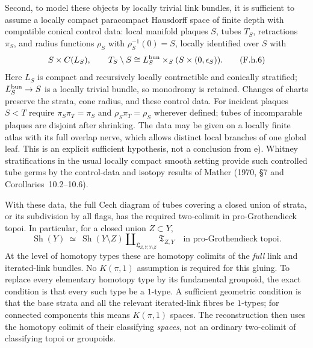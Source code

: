 Second, to model these objects by locally trivial link bundles, it is
sufficient to assume a locally compact paracompact Hausdorff space of
finite depth with compatible conical control data: local manifold
plaques $S$, tubes $T_S$, retractions $\pi_S$, and radius functions
$\rho_S$ with $\rho_S^{-1}(0)=S$, locally identified over $S$ with
\[
 S\times C(L_S),\qquad
 T_S\setminus S\cong L_S^{\rm bun}\times_S(S\times(0,\epsilon_S)).
 \tag{F.h.6}
\]
Here $L_S$ is compact and recursively locally contractible and
conically stratified; $L_S^{\rm bun}\to S$ is a locally trivial bundle,
so monodromy is retained. Changes of charts preserve the strata, cone
radius, and these control data. For incident plaques $S<T$ require
$\pi_S\pi_T=\pi_S$ and $\rho_S\pi_T=\rho_S$ wherever defined;
tubes of incomparable plaques are disjoint after shrinking. The data
may be given on a locally finite atlas with its full overlap nerve,
which allows distinct local branches of one global leaf. This is an
explicit sufficient hypothesis, not a conclusion from e). Whitney
stratifications in the usual locally compact smooth setting provide
such controlled tube germs by the control-data and isotopy results of
Mather (1970, \S7 and Corollaries~10.2--10.6)\cite{Mather1970Local}.

With these data, the full Cech diagram of tubes covering a closed
union of strata, or its subdivision by all flags, has the required
two-colimit in pro-Grothendieck topoi. In particular, for a closed
union $Z\subset Y$,
\[
 \operatorname{Sh}(Y)\ \simeq\
 \operatorname{Sh}(Y\setminus Z)
       \amalg_{\mathfrak L_{Z,Y;Y\setminus Z}}
       \mathfrak T_{Z,Y}
 \quad\text{in pro-Grothendieck topoi}.
 \tag{F.h.7}
\]
At the level of homotopy types these are homotopy colimits of the
\emph{full} link and iterated-link bundles. No $K(\pi,1)$ assumption
is required for this gluing. To replace every elementary homotopy type
by its fundamental groupoid, the exact condition is that every such
type be a $1$-type. A sufficient geometric condition is that the base
strata and all the relevant iterated-link fibres be $1$-types; for
connected components this means $K(\pi,1)$ spaces. The reconstruction
then uses the homotopy colimit of their classifying \emph{spaces}, not
an ordinary two-colimit of classifying topoi or groupoids.

